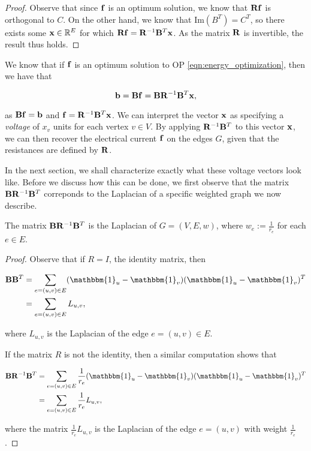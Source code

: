\documentclass[11pt]{article}
\begin{document}
\begin{proof}

Observe that since $\V{f}$ is an optimum solution, we know that $\V{Rf}$ is orthogonal
to $C$. On the other hand, we know that $\text{Im}(B^{T})= C^{T}$, so there exists
some $\V{x} \in \rea^{E}$ for which $\V{Rf}= \V{R}^{-1}\V{B}^{T}\V{x}$.
As the matrix $\V{R}$ is invertible, the result thus holds.


\end{proof}

We know that if $\V{f}$ is an optimum solution to OP \ref{eqn:energy_optimization},
then we have that

\[
	\V{b} = \V{Bf}=\V{B}\V{R}^{-1}\V{B}^{T}\V{x},
\]

as $\V{Bf}=\V{b}$ and $\V{f}=\V{R}^{-1}\V{B}^{T}\V{x}$.
We can interpret the vector $\V{x}$ as specifying a \textit{voltage} of $x_{v}$ units
for each vertex $v \in V$. By applying $\V{R}^{-1}\V{B}^{T}$ to this vector $\V{x}$,
we can then recover the electrical current $\V{f}$ on the edges $G$, given that the
resistances are defined by $\V{R}$.

In the next section, we shall characterize exactly what these voltage vectors look like.
Before we discuss how this can be done, we first observe that the matrix $\V{B}\V{R}^{-1}\V{B}^{T}$
correponds to the Laplacian of a specific weighted graph we now describe.

\begin{lemma}

The matrix $\V{B}\V{R}^{-1}\V{B}^{T}$ is the Laplacian of $G=(V,E,w)$,
where $w_{e}:=\frac{1}{r_{e}}$ for each $e\in E$.


\end{lemma}


\begin{proof}

Observe that if $R=I$, the identity matrix, then

\begin{align*}
	\V{B}\V{B}^{T} &= \sum_{e =(u,v) \in E}( \mathbbm{1}_{u}-\mathbbm{1}_{v})( \mathbbm{1}_{u} - \mathbbm{1}_{v})^{T}	\\
			     &= \sum_{e = (u,v) \in E} L_{u,v},
\end{align*}

where $L_{u,v}$ is the Laplacian of the edge $e=(u,v) \in E$.

If the matrix $R$ is not the identity, then a similar computation shows that

\begin{align*}
	\V{B} \V{R}^{-1}\V{B}^{T} &= \sum_{e =(u,v) \in E}\frac{1}{r_{e}}( \mathbbm{1}_{u}-\mathbbm{1}_{v})( \mathbbm{1}_{u} - \mathbbm{1}_{v})^{T}	\\
			     &= \sum_{e = (u,v) \in E} \frac{1}{r_e} L_{u,v},
\end{align*}

where the matrix $\frac{1}{r_e} L_{u,v}$ is the Laplacian of the edge $e=(u,v)$ with weight $\frac{1}{r_{e}}$.



\end{proof}
\end{document}
